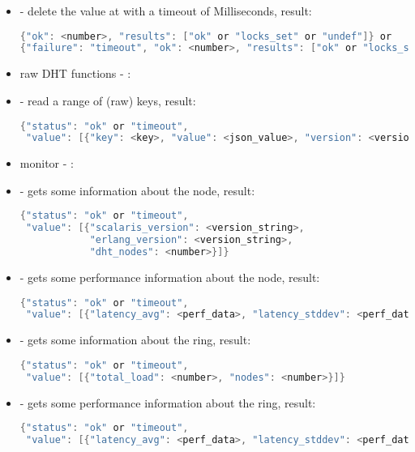 \begin{itemize}
\begin{lstlisting}[language=java]
{"ok": <number>, "results": ["ok" or "locks_set" or "undef"]} or
{"failure": "timeout", "ok": <number>, "results": ["ok" or "locks_set" or "undef"]}
\end{lstlisting}
  \item {} - delete the value at  with a timeout of  Milliseconds, result:
\begin{lstlisting}[language=java]
{"ok": <number>, "results": ["ok" or "locks_set" or "undef"]} or
{"failure": "timeout", "ok": <number>, "results": ["ok" or "locks_set" or "undef"]}
\end{lstlisting}
  \item[] \hspace{-1.7em}raw DHT functions - :
  \item {} - read a range of (raw) keys, result:
\begin{lstlisting}[language=java]
{"status": "ok" or "timeout",
 "value": [{"key": <key>, "value": <json_value>, "version": <version>}]}
\end{lstlisting}
  \item[] \hspace{-1.7em}monitor - :
  \item {} - gets some information about the node, result:
\begin{lstlisting}[language=java]
{"status": "ok" or "timeout",
 "value": [{"scalaris_version": <version_string>,
            "erlang_version": <version_string>,
            "dht_nodes": <number>}]}
\end{lstlisting}
  \item {} - gets some performance information about the node, result:
\begin{lstlisting}[language=java]
{"status": "ok" or "timeout",
 "value": [{"latency_avg": <perf_data>, "latency_stddev": <perf_data>}]}
\end{lstlisting}
  \item {} - gets some information about the \scalaris{} ring, result:
\begin{lstlisting}[language=java]
{"status": "ok" or "timeout",
 "value": [{"total_load": <number>, "nodes": <number>}]}
\end{lstlisting}
  \item {} - gets some performance information about the \scalaris{} ring, result:
\begin{lstlisting}[language=java]
{"status": "ok" or "timeout",
 "value": [{"latency_avg": <perf_data>, "latency_stddev": <perf_data>}]}
\end{lstlisting}
\end{itemize}

